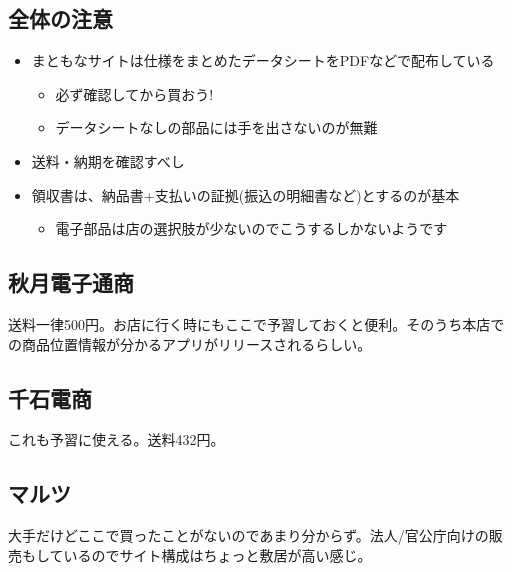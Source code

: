 \documentclass[letterpaper,10pt,dvipdfmx]{sphinxmanual}
\begin{document}
\subsection{全体の注意}
\label{\detokenize{buy_parts:}}\label{\detokenize{buy_parts:id13}}\begin{itemize}
\item {} 
まともなサイトは仕様をまとめたデータシートをPDFなどで配布している
\begin{itemize}
\item {} 
必ず確認してから買おう!

\item {} 
データシートなしの部品には手を出さないのが無難

\end{itemize}

\item {} 
送料・納期を確認すべし

\item {} 
領収書は、納品書+支払いの証拠(振込の明細書など)とするのが基本
\begin{itemize}
\item {} 
電子部品は店の選択肢が少ないのでこうするしかないようです

\end{itemize}

\end{itemize}


\subsection{秋月電子通商}
\label{\detokenize{buy_parts:}}\label{\detokenize{buy_parts:id14}}
送料一律500円。お店に行く時にもここで予習しておくと便利。そのうち本店での商品位置情報が分かるアプリがリリースされるらしい。


\subsection{千石電商}
\label{\detokenize{buy_parts:}}\label{\detokenize{buy_parts:id15}}
これも予習に使える。送料432円。


\subsection{マルツ}
\label{\detokenize{buy_parts:}}\label{\detokenize{buy_parts:id16}}
大手だけどここで買ったことがないのであまり分からず。法人/官公庁向けの販売もしているのでサイト構成はちょっと敷居が高い感じ。
\end{document}
